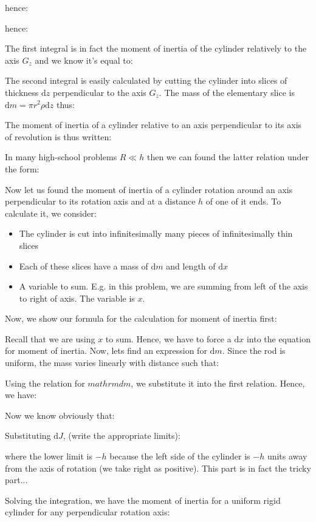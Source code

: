 {	hence:
	
	hence:
	
	The first integral is in fact the moment of inertia of the cylinder relatively to the axis $G_z$ and we know it's equal to:
	
	The second integral is easily calculated by cutting the cylinder into slices  of thickness $\mathrm{d}z$ perpendicular to the axis $G_z$. The mass of the elementary slice is $\mathrm{d}m=\pi r^2\rho\mathrm{d}z$ thus:
	
	The moment of inertia of a cylinder relative to an axis perpendicular to its axis of revolution is thus written:
	
	In many high-school problems $R\ll h$ then we can found the latter relation under the form:
	
	Now let us found the moment of inertia of a cylinder rotation around an axis perpendicular to its rotation axis and at a distance $h$ of one of it ends. To calculate it, we consider:
	\begin{itemize}
		\item The cylinder is cut into infinitesimally many pieces of infinitesimally thin slices

		\item Each of these slices have a mass of $\mathrm{d}m$ and length of $\mathrm{d}x$

		\item A variable to sum. E.g. in this problem, we are summing from left of the axis to right of axis. The variable is $x$.
	\end{itemize}
	Now, we show our formula for the calculation for moment of inertia first:
	
	Recall that we are using $x$ to sum. Hence, we have to force a $\mathrm{d}x$ into the equation for moment of inertia. Now, lets find an expression for $\mathrm{d}m$. Since the rod is uniform, the mass varies linearly with distance such that:
	
	Using the relation for $mathrm{d}m$, we substitute it into the first relation. Hence, we have:
	
	Now we know obviously that:
	
	Substituting $\mathrm{d}J$, (write the appropriate limits):
	
	where the lower limit is $-h$ because the left side of the cylinder is $-h$ units away from the axis of rotation (we take right as positive). This part is in fact the tricky part...

	Solving the integration, we have the moment of inertia for a uniform rigid cylinder for any perpendicular rotation axis:
	
}
